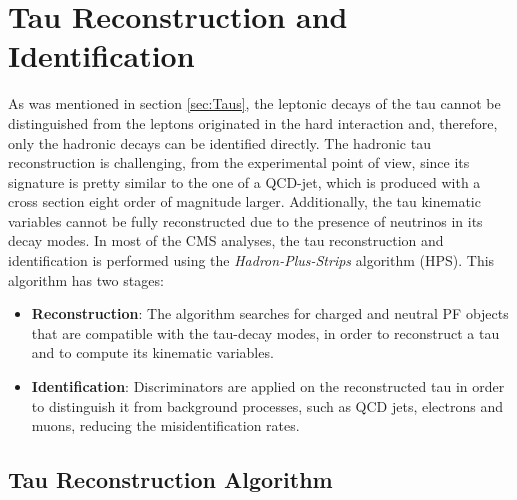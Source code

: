 \section{Tau Reconstruction and Identification}
\label{sec:RecoTau}

As was mentioned in section \ref{sec:Taus}, the leptonic decays of the tau
cannot be distinguished from the leptons originated in the hard interaction and,
therefore, only the hadronic decays can be identified directly. The hadronic tau 
reconstruction is challenging, from the experimental point of view, since its
signature is pretty similar to the one of a QCD-jet, which is produced 
with a cross section eight order of magnitude larger. Additionally, 
the tau kinematic variables cannot be fully reconstructed due to the presence
of neutrinos in its decay modes. In most of the CMS analyses, the 
tau reconstruction and identification is performed 
using the \textit{Hadron-Plus-Strips} algorithm (HPS)\cite{CMS-PAS-TAU-16-002}. This 
algorithm has two stages:

\begin{itemize}
 \item \textbf{Reconstruction}: The algorithm searches for 
 charged and neutral PF objects that are compatible with the tau-decay modes, 
 in order to reconstruct a tau and to compute its kinematic variables.
 \item \textbf{Identification}: Discriminators are applied on the 
 reconstructed tau in order to distinguish it from background processes,
 such as QCD jets, electrons and muons, reducing the misidentification rates.
\end{itemize}

\subsection{Tau Reconstruction Algorithm}
\label{subsec:HPS}

